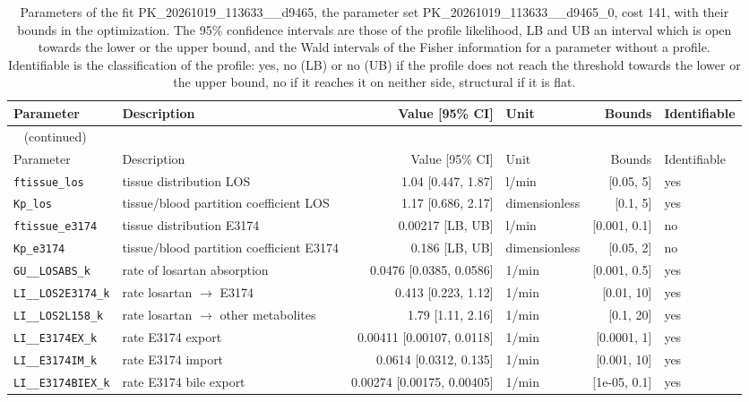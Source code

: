 \documentclass{article}
\begin{document}
\begin{longtable}{llrlrl}
\caption{Parameters of the fit PK\_20261019\_113633\_\_d9465, the parameter set PK\_20261019\_113633\_\_d9465\_0, cost 141, with their bounds in the optimization. The 95\% confidence intervals are those of the profile likelihood, LB and UB an interval which is open towards the lower or the upper bound, and the Wald intervals of the Fisher information for a parameter without a profile. Identifiable is the classification of the profile: yes, no (LB) or no (UB) if the profile does not reach the threshold towards the lower or the upper bound, no if it reaches it on neither side, structural if it is flat.}\label{tab:parameters:PK_20261019_113633__d9465} \\
\toprule
Parameter & Description & Value [95\% CI] & Unit & Bounds & Identifiable \\
\midrule
\endfirsthead
\multicolumn{6}{l}{\small\tablename~\thetable{} (continued)} \\
\toprule
Parameter & Description & Value [95\% CI] & Unit & Bounds & Identifiable \\
\midrule
\endhead
\bottomrule
\endlastfoot
\texttt{ftissue\_los} & tissue distribution LOS & 1.04 [0.447, 1.87] & l/min & [0.05, 5] & yes \\
\texttt{Kp\_los} & tissue/blood partition coefficient LOS & 1.17 [0.686, 2.17] & dimensionless & [0.1, 5] & yes \\
\texttt{ftissue\_e3174} & tissue distribution E3174 & 0.00217 [LB, UB] & l/min & [0.001, 0.1] & no \\
\texttt{Kp\_e3174} & tissue/blood partition coefficient E3174 & 0.186 [LB, UB] & dimensionless & [0.05, 2] & no \\
\texttt{GU\_\_LOSABS\_k} & rate of losartan absorption & 0.0476 [0.0385, 0.0586] & 1/min & [0.001, 0.5] & yes \\
\texttt{LI\_\_LOS2E3174\_k} & rate losartan \ensuremath{\rightarrow} E3174 & 0.413 [0.223, 1.12] & 1/min & [0.01, 10] & yes \\
\texttt{LI\_\_LOS2L158\_k} & rate losartan \ensuremath{\rightarrow} other metabolites & 1.79 [1.11, 2.16] & 1/min & [0.1, 20] & yes \\
\texttt{LI\_\_E3174EX\_k} & rate E3174 export & 0.00411 [0.00107, 0.0118] & 1/min & [0.0001, 1] & yes \\
\texttt{LI\_\_E3174IM\_k} & rate E3174 import & 0.0614 [0.0312, 0.135] & 1/min & [0.001, 10] & yes \\
\texttt{LI\_\_E3174BIEX\_k} & rate E3174 bile export & 0.00274 [0.00175, 0.00405] & 1/min & [1e-05, 0.1] & yes \\

\end{longtable}
\end{document}
